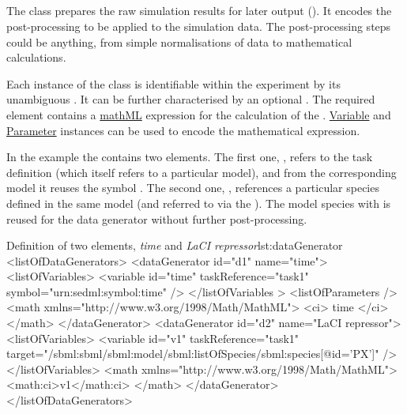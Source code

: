 \subsection{}
\label{class:dataGenerator}

The  class prepares the raw simulation results for later output (). It encodes the post-processing  to be applied to the simulation data. The post-processing steps could be anything, from simple normalisations of data to mathematical calculations. 


Each instance of the  class is identifiable within the experiment by its unambiguous \hyperref[sec:id]{}. It can be further characterised by an optional \hyperref[sec:name]{}. The required \hyperref[sec:math]{} element contains a \hyperref[sec:mathML]{mathML} expression for the calculation of the . \hyperref[class:variable]{Variable} and \hyperref[class:parameter]{Parameter} instances can be used to encode the mathematical expression.

In the example the  contains two  elements. 
The first one, , refers to the task definition  (which itself refers to a particular model), and from the corresponding model it reuses the symbol . The second one, , references a particular species defined in the same model (and referred to via the ). The model species with   is reused for the data generator  without further post-processing.
\begin{myXmlLst}{Definition of two  elements, \emph{time} and \emph{LaCI repressor}}{lst:dataGenerator}
<listOfDataGenerators>
	<dataGenerator id="d1" name="time">
		<listOfVariables>
			<variable id="time" taskReference="task1" symbol="urn:sedml:symbol:time" />
		</listOfVariables >
		<listOfParameters />
		<math xmlns="http://www.w3.org/1998/Math/MathML">
			<ci> time </ci>
		</math>
	</dataGenerator>
	<dataGenerator id="d2" name="LaCI repressor">
		<listOfVariables>
			<variable id="v1" taskReference="task1" 
				target="/sbml:sbml/sbml:model/sbml:listOfSpecies/sbml:species[@id='PX']" />
		</listOfVariables>
		<math xmlns="http://www.w3.org/1998/Math/MathML">
			<math:ci>v1</math:ci>
		</math>
	</dataGenerator>
</listOfDataGenerators>
\end{myXmlLst}

